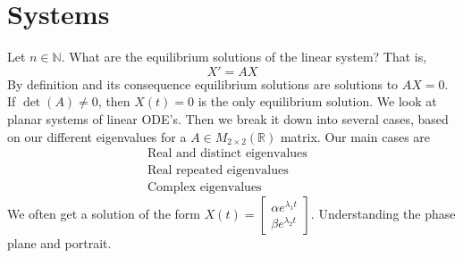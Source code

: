 \documentclass{article}
\theoremstyle{definition}
\begin{document}
\section{Systems}
Let $n \in \mathbb{N}$. What are the equilibrium solutions of the linear system? That is,
\[X' = AX\]
By definition and its consequence equilibrium solutions are solutions to $AX = 0$.
If $\det(A) \neq 0$, then $X(t) = 0$ is the only equilibrium solution.
We look at planar systems of linear ODE's. Then we break it down into several cases,
based on our different eigenvalues for a $A \in M_{2 \times 2}(\mathbb{R})$ matrix.
Our main cases are 
\begin{align}
    \text{Real and distinct eigenvalues} & \\
    \text{Real repeated eigenvalues} & \\
    \text{Complex eigenvalues}
\end{align}
We often get a solution of the form $X(t) = \begin{bmatrix}
    \alpha e ^{\lambda_1 t} \\ \beta e^{\lambda_2 t}
\end{bmatrix}$.
Understanding the phase plane and portrait.
\end{document}
